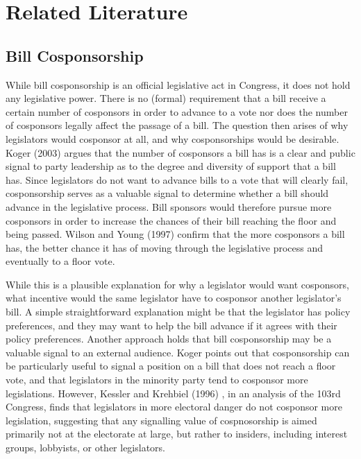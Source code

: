 \documentclass{article}
\begin{document}
\section{Related Literature}
\subsection{Bill Cosponsorship}
While bill cosponsorship is an official legislative act in Congress, it does not hold any legislative power. There is no (formal) requirement that a bill receive a certain number of cosponsors in order to advance to a vote nor does the number of cosponsors legally affect the passage of a bill. The question then arises of why legislators would cosponsor at all, and why cosponsorships would be desirable. Koger (2003) \cite{koger2003} argues that the number of cosponsors a bill has is a clear and public signal to party leadership as to the degree and diversity of support that a bill has. Since legislators do not want to advance bills to a vote that will clearly fail, cosponsorship serves as a valuable signal to determine whether a bill should advance in the legislative process. Bill sponsors would therefore pursue more cosponsors in order to increase the chances of their bill reaching the floor and being passed. Wilson and Young (1997) \cite{wilson_young1997} confirm that the more cosponsors a bill has, the better chance it has of moving through the legislative process and eventually to a floor vote.

While this is a plausible explanation for why a legislator would want cosponsors, what incentive would the same legislator have to cosponsor another legislator's bill. A simple straightforward explanation might be that the legislator has policy preferences, and they may want to help the bill advance if it agrees with their policy preferences. Another approach holds that bill cosponsorship may be a valuable signal to an external audience. Koger \cite{koger2003} points out that cosponsorship can be particularly useful to signal a position on a bill that does not reach a floor vote, and that legislators in the minority party tend to cosponsor more legislations. However, Kessler and Krehbiel (1996) \cite{kessler_krehbiel1996}, in an analysis of the 103rd Congress, finds that legislators in more electoral danger do not cosponsor more legislation, suggesting that any signalling value of cospnosorship is aimed primarily not at the electorate at large, but rather to insiders, including interest groups, lobbyists, or other legislators. 
\end{document}
